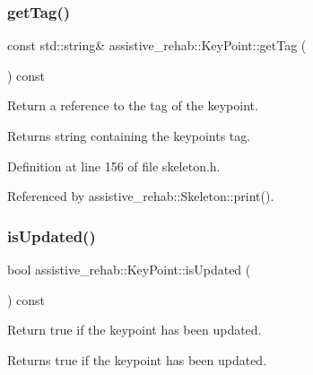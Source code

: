 \mbox{\label{classassistive__rehab_1_1KeyPoint_ace24db46297c42bee32acd87d7450dcd}} 
\subsubsection{\texorpdfstring{getTag()}{getTag()}}
{\footnotesize\ttfamily const std\+::string\& assistive\+\_\+rehab\+::\+Key\+Point\+::get\+Tag (\begin{DoxyParamCaption}{ }\end{DoxyParamCaption}) const\hspace{0.3cm}{\ttfamily [inline]}}



Return a reference to the tag of the keypoint. 

\begin{DoxyReturn}{Returns}
string containing the keypoint\textquotesingle{}s tag. 
\end{DoxyReturn}


Definition at line 156 of file skeleton.\+h.


\begin{DoxyCode}{0}

\end{DoxyCode}


Referenced by assistive\+\_\+rehab\+::\+Skeleton\+::print().

\mbox{\label{classassistive__rehab_1_1KeyPoint_ab1c339fe8a6dd281534d54bb0fdb3c50}} 
\subsubsection{\texorpdfstring{isUpdated()}{isUpdated()}}
{\footnotesize\ttfamily bool assistive\+\_\+rehab\+::\+Key\+Point\+::is\+Updated (\begin{DoxyParamCaption}{ }\end{DoxyParamCaption}) const\hspace{0.3cm}{\ttfamily [inline]}}



Return true if the keypoint has been updated. 

\begin{DoxyReturn}{Returns}
true if the keypoint has been updated. 
\end{DoxyReturn}


